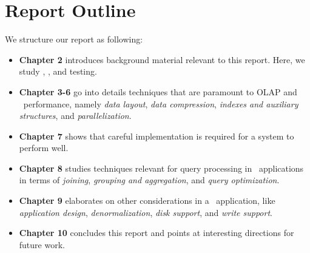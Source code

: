 \section{Report Outline}
\label{sec:Thesis Outline}
We structure our report as following:
\begin{itemize}
  \item \textbf{Chapter 2} introduces background material relevant to this report. Here, we study \bi, \bd, and testing.
  \item \textbf{Chapter 3-6} go into details techniques that are paramount to OLAP and \bd~performance, namely \textit{data layout}, \textit{data compression}, \textit{indexes and auxiliary structures}, and \textit{parallelization}.
  \item \textbf{Chapter 7} shows that careful implementation is required for a system to perform well.
  \item \textbf{Chapter 8} studies techniques relevant for query processing in \bd~applications in terms of \textit{joining}, \textit{grouping and aggregation}, and \textit{query optimization}.
  \item \textbf{Chapter 9} elaborates on other considerations in a \bd~application, like \textit{application design}, \textit{denormalization}, \textit{disk support}, and \textit{write support}.
  \item \textbf{Chapter 10} concludes this report and points at interesting directions for future work.
\end{itemize}

